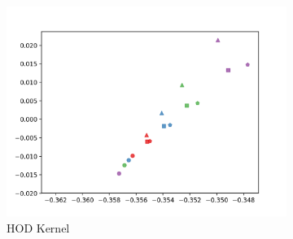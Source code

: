 \documentclass[10pt]{article}
\begin{document}
\begin{figure}[H]
\begin{subfigure}[h]{0.3\textwidth}
        \includegraphics[width=\linewidth]{mh_hod}
        \caption{HOD Kernel}
    \end{subfigure}%
    \begin{subfigure}[h]{0.05\textwidth}

\end{subfigure}
\end{figure}
\end{document}

